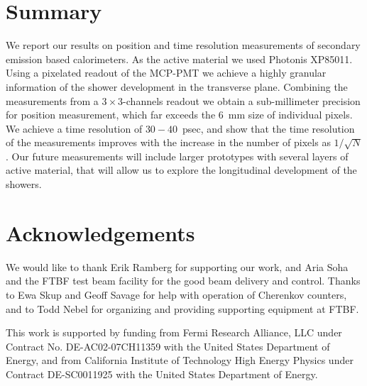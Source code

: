 \documentclass[12pt]{article}
\begin{document}
\section{Summary} 

We report our results on position and time resolution measurements of secondary
emission based calorimeters. As the active material we used Photonis XP85011.
Using a pixelated readout of the MCP-PMT we achieve a highly granular information of
the shower development in the transverse plane. Combining the measurements from
a $3\times3$-channels readout we obtain a sub-millimeter precision for position
measurement, which far exceeds the 6~mm size of individual pixels. We achieve a
time resolution of $30-40$~psec, and show that the time resolution of the
measurements improves with the increase in the number of pixels as $1/\sqrt{N}$.
Our future measurements will include larger prototypes with several layers of
active material, that will allow us to explore the longitudinal development of
the showers.


\section{Acknowledgements} We would like to thank Erik Ramberg for supporting 
our work, and Aria Soha and the FTBF test beam facility for the good beam
delivery and control. Thanks to Ewa Skup and Geoff Savage for help with
operation of Cherenkov counters, and to Todd Nebel for organizing and providing
supporting equipment at FTBF. 

This work is supported by funding from Fermi Research Alliance, LLC under
Contract No. DE-AC02-07CH11359 with the United States Department of Energy, and
from California Institute of Technology High Energy Physics under Contract
DE-SC0011925 with the United States Department of Energy.

{}
 
\end{document}
